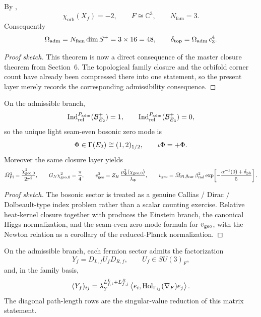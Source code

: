 \begin{theorem}
By ,
\[
\chi_{\mathrm{orb}}(X_f)=-2,
\qquad
F\cong\mathbb C^3,
\qquad
N_{\mathrm{fam}}=3.
\]
Consequently
\[
\Omega_{\mathrm{adm}}=N_{\mathrm{fam}}\dim S^+=3\times 16=48,
\qquad
\delta_{\mathrm{top}}=\Omega_{\mathrm{adm}}\,c_3^4.
\]
\end{theorem}

\begin{proof}[Proof sketch]
This theorem is now a direct consequence of the master closure theorem from Section~6. The
topological family closure and the orbifold corner count have already been compressed there
into one statement, so the present layer merely records the corresponding admissibility
consequence.
\end{proof}

\begin{theorem}
On the admissible branch,
\[
\operatorname{Ind}_{\mathrm{rel}}^{P_{\mathrm{adm}}}(\mathcal B_{E_2}^+)=1,
\qquad
\operatorname{Ind}_{\mathrm{rel}}^{P_{\mathrm{adm}}}(\mathcal B_{E_3}^+)=0,
\]
so the unique light seam-even bosonic zero mode is
\[
\Phi\in\Gamma(E_2)\cong(1,2)_{1/2},
\qquad
\iota\Phi=+\Phi.
\]
Moreover the same closure layer yields
\[
\bar M_{\mathrm{Pl}}^2=\frac{\chi_{\mathrm{geo},0}^2}{2\pi^2},
\qquad
G_N\chi_{\mathrm{geo},0}^2=\frac{\pi}{4},
\qquad
v_{\mathrm{geo}}^2=Z_H\,\frac{\mu_\Phi^2(\chi_{\mathrm{geo},0})}{\lambda_\Phi},
\qquad
v_{\mathrm{geo}}=\bar M_{\mathrm{Pl}}\,g_{\mathrm{car}}\,\beta_{\mathrm{rad}}^2
\exp\!\left[-\frac{\alpha^{-1}(0)+\delta_{\mathrm{ph}}}{5}\right].
\]
\end{theorem}

\begin{proof}[Proof sketch]
The bosonic sector is treated as a genuine Callias / Dirac / Dolbeault-type index problem rather than a scalar counting exercise. Relative heat-kernel closure together with  produces the Einstein branch, the canonical Higgs normalization, and the seam-even zero-mode formula for $v_{\mathrm{geo}}$, with the Newton relation as a corollary of the reduced-Planck normalization.
\end{proof}

\begin{theorem}
On the admissible branch, each fermion sector admits the factorization
\[
Y_f=D_{L,f}U_fD_{R,f},
\qquad
U_f\in SU(3)_F,
\]
and, in the family basis,
\[
(Y_f)_{ij}
=
\lambda_Y^{L^L_{f,i}+L^R_{f,j}}
\left\langle e_i,\mathrm{Hol}_{\Gamma_{ij}}(\nabla_F)e_j\right\rangle.
\]
The diagonal path-length rows  are the singular-value reduction of this matrix statement.
\end{theorem}

